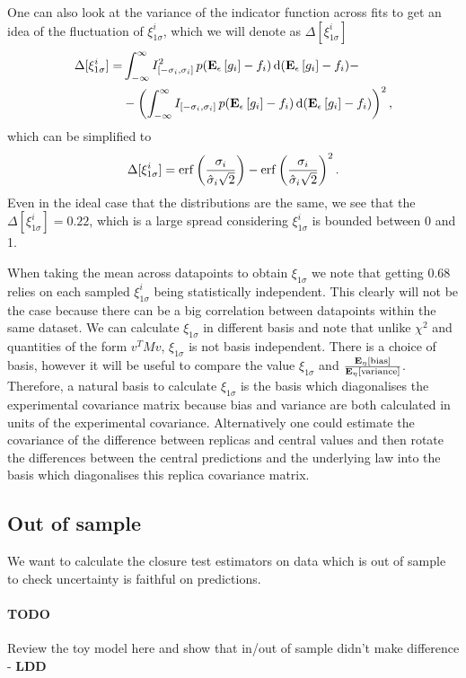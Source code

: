 One can also look at the variance of the indicator function across fits to get
an idea of the fluctuation of $\xi_{1\sigma}^{i}$, which we will denote as
$\Delta[\xi_{1\sigma}^{i}]$
\begin{equation}
    \label{eq:XiIVar}
    \begin{split}
        \Delta[\xi_{1\sigma}^{i}] 
        =& \int_{-\infty}^{\infty} I_{[-\sigma_i, \sigma_i]}^2\, 
            p(\mathbf{E}_{\epsilon}\left[ g_i \right] - f_i)\,
            {\rm d}(\mathbf{E}_{\epsilon}\left[ g_i \right] - f_i) - \\
        &- \left( \int_{-\infty}^{\infty} I_{[-\sigma_i, \sigma_i]}\,
            p(\mathbf{E}_{\epsilon}\left[ g_i \right] - f_i)\,
            {\rm d}(\mathbf{E}_{\epsilon}\left[ g_i \right] - f_i) \right)^2,
    \end{split}
\end{equation}
which can be simplified to
\begin{equation}
    \label{eq:XiIVarSimplified}
    \Delta[\xi_{1\sigma}^{i}] =
    {\rm erf} \left( \frac{\sigma_i}{\hat{\sigma}_i \sqrt{2}}\right) -
    {\rm erf} \left( \frac{\sigma_i}{\hat{\sigma}_i \sqrt{2}}\right)^2.
\end{equation}
Even in the ideal case that the distributions are the same, we see that the
$\Delta[\xi_{1\sigma}^{i}] = 0.22$, which is a large spread considering
$\xi_{1\sigma}^{i}$ is bounded between 0 and 1.

When taking the mean across datapoints to obtain $\xi_{1\sigma}$ we note that
getting 0.68 relies on each sampled $\xi_{1\sigma}^{i}$ being statistically
independent. This clearly will not be the case because there can be a big
correlation between datapoints within the same dataset. We can calculate
$\xi_{1\sigma}$ in different basis and note that unlike $\chi^2$ and quantities
of the form $v^T M v$, $\xi_{1\sigma}$ is not basis independent. There is a
choice of basis, however it will be useful to compare the value $\xi_{1\sigma}$
and $\frac{\mathbf{E}_{\eta}\left[ {\rm bias} \right]}{\mathbf{E}_{\eta}\left[ {\rm variance} \right]}$. Therefore, a natural basis to
calculate $\xi_{1\sigma}$ is the basis which diagonalises the experimental
covariance matrix because bias and variance are both calculated in units of the
experimental
covariance. Alternatively one could estimate the covariance of the difference
between replicas and central values and then rotate the differences between
the central predictions and the underlying law into the basis which diagonalises
this replica covariance matrix.

\subsection{Out of sample}

We want to calculate the closure test estimators on data which is out of sample
to check uncertainty is faithful on predictions.

\paragraph{TODO}{Review the toy model here and show that in/out of sample
didn't make difference - {\bf LDD}}
